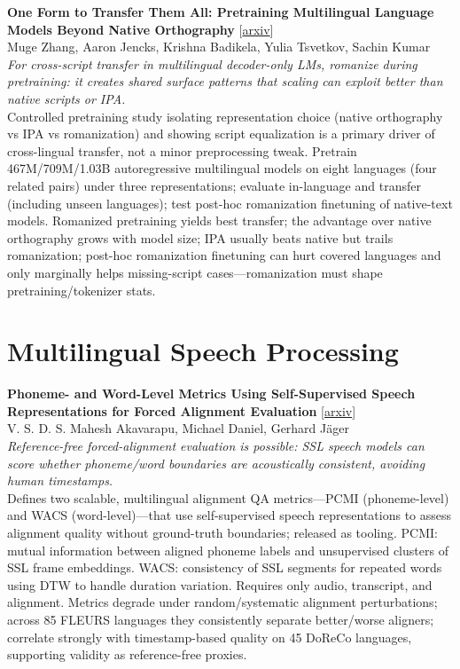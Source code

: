 \documentclass[12pt,letterpaper]{article}
\begin{document}
\medskip

{\small\textbf{One Form to Transfer Them All: Pretraining Multilingual Language Models Beyond Native Orthography}} {\scriptsize[\href{https://arxiv.org/abs/2608.25904}{arxiv}]}\\
{\scriptsize Muge Zhang, Aaron Jencks, Krishna Badikela, Yulia Tsvetkov, Sachin Kumar}\\

{\small\textit{For cross-script transfer in multilingual decoder-only LMs, romanize during pretraining: it creates shared surface patterns that scaling can exploit better than native scripts or IPA.}}\\[1pt]
{\footnotesize Controlled pretraining study isolating representation choice (native orthography vs IPA vs romanization) and showing script equalization is a primary driver of cross-lingual transfer, not a minor preprocessing tweak. Pretrain 467M/709M/1.03B autoregressive multilingual models on eight languages (four related pairs) under three representations; evaluate in-language and transfer (including unseen languages); test post-hoc romanization finetuning of native-text models. Romanized pretraining yields best transfer; the advantage over native orthography grows with model size; IPA usually beats native but trails romanization; post-hoc romanization finetuning can hurt covered languages and only marginally helps missing-script cases---romanization must shape pretraining/tokenizer stats.}

\medskip


\section*{Multilingual Speech Processing}

{\small\textbf{Phoneme- and Word-Level Metrics Using Self-Supervised Speech Representations for Forced Alignment Evaluation}} {\scriptsize[\href{https://arxiv.org/abs/2608.28508}{arxiv}]}\\
{\scriptsize V. S. D. S. Mahesh Akavarapu, Michael Daniel, Gerhard J\"ager}\\

{\small\textit{Reference-free forced-alignment evaluation is possible: SSL speech models can score whether phoneme/word boundaries are acoustically consistent, avoiding human timestamps.}}\\[1pt]
{\footnotesize Defines two scalable, multilingual alignment QA metrics---PCMI (phoneme-level) and WACS (word-level)---that use self-supervised speech representations to assess alignment quality without ground-truth boundaries; released as tooling. PCMI: mutual information between aligned phoneme labels and unsupervised clusters of SSL frame embeddings. WACS: consistency of SSL segments for repeated words using DTW to handle duration variation. Requires only audio, transcript, and alignment. Metrics degrade under random/systematic alignment perturbations; across 85 FLEURS languages they consistently separate better/worse aligners; correlate strongly with timestamp-based quality on 45 DoReCo languages, supporting validity as reference-free proxies.}
\end{document}
